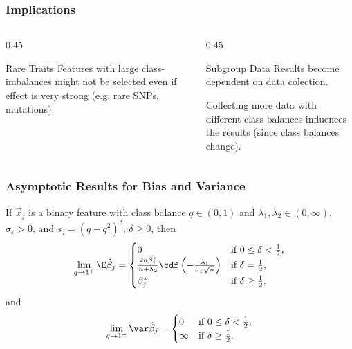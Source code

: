 \documentclass[aspectratio=1610,onlytextwidth]{beamer}
\begin{document}
\begin{frame}[c]
  \frametitle{Implications}
  \begin{columns}[T]
    \begin{column}{0.45\textwidth}
      \begin{block}{Rare Traits}
        Features with large class-imbalances might not be selected even if effect is \alert{very strong}
        (e.g. rare SNPs, mutations).
      \end{block}
    \end{column}
    \pause
    \begin{column}{0.45\textwidth}
      \begin{block}{Subgroup Data}
        Results become dependent on data colection. \medskip

        Collecting more data with different class balances influences the results (since class
        balances change).
      \end{block}

    \end{column}
  \end{columns}
\end{frame}

\begin{frame}[c]
  \frametitle{Asymptotic Results for Bias and Variance}

  \begin{theorem}
    If \(\vec{x}_j\) is a binary feature with class balance \(q \in (0, 1)\) and \(\lambda_1,\lambda_2 \in (0,\infty)\), \(\sigma_\varepsilon > 0\), and \(s_j = (q - q^2)^{\delta}\), \(\delta \geq 0\), then
    \[
      \lim_{q \rightarrow 1^+} \E \hat{\beta}_j =
      \begin{cases}
        0                                                                                                  & \text{if } 0 \leq \delta < \frac{1}{2}, \\
        \frac{2n \beta_j^*}{n + \lambda_2} \cdf\left(-\frac{\lambda_1}{\sigma_\varepsilon \sqrt{n}}\right) & \text{if } \delta = \frac{1}{2},        \\
        \beta^*_j                                                                                          & \text{if } \delta \geq \frac{1}{2}.
      \end{cases}
    \]
    \pause and
    \[
      \lim_{q \rightarrow 1^+} \var \hat{\beta}_j =
      \begin{cases}
        0      & \text{if } 0 \leq \delta < \frac{1}{2}, \\
        \infty & \text{if } \delta \geq \frac{1}{2}.
      \end{cases}
    \]
  \end{theorem}

\end{frame}
\end{document}
